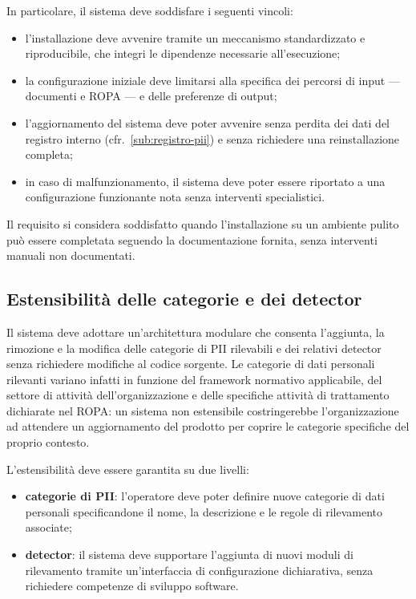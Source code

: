 In particolare, il sistema deve soddisfare i seguenti vincoli:
\begin{itemize}
	\item l'installazione deve avvenire tramite un meccanismo standardizzato e riproducibile, che integri le dipendenze necessarie all'esecuzione;
	\item la configurazione iniziale deve limitarsi alla specifica dei percorsi di input --- documenti e ROPA --- e delle preferenze di output;
	\item l'aggiornamento del sistema deve poter avvenire senza perdita dei dati del registro interno (cfr.~\ref{sub:registro-pii}) e senza richiedere una reinstallazione completa;
	\item in caso di malfunzionamento, il sistema deve poter essere riportato a una configurazione funzionante nota senza interventi specialistici.
\end{itemize} \medskip

Il requisito si considera soddisfatto quando l'installazione su un ambiente pulito può essere completata seguendo la documentazione fornita, senza interventi manuali non documentati.

\subsection{Estensibilità delle categorie e dei detector}
\label{sub:estensibilita}
Il sistema deve adottare un'architettura modulare che consenta l'aggiunta, la rimozione e la modifica delle categorie di PII rilevabili e dei relativi detector senza richiedere modifiche al codice sorgente. Le categorie di dati personali rilevanti variano infatti in funzione del framework normativo applicabile, del settore di attività dell'organizzazione e delle specifiche attività di trattamento dichiarate nel ROPA: un sistema non estensibile costringerebbe l'organizzazione ad attendere un aggiornamento del prodotto per coprire le categorie specifiche del proprio contesto. \medskip

L'estensibilità deve essere garantita su due livelli:
\begin{itemize}
	\item \textbf{categorie di PII}: l'operatore deve poter definire nuove categorie di dati personali specificandone il nome, la descrizione e le regole di rilevamento associate;
	\item \textbf{detector}: il sistema deve supportare l'aggiunta di nuovi moduli di rilevamento tramite un'interfaccia di configurazione dichiarativa, senza richiedere competenze di sviluppo software.
\end{itemize} \medskip

